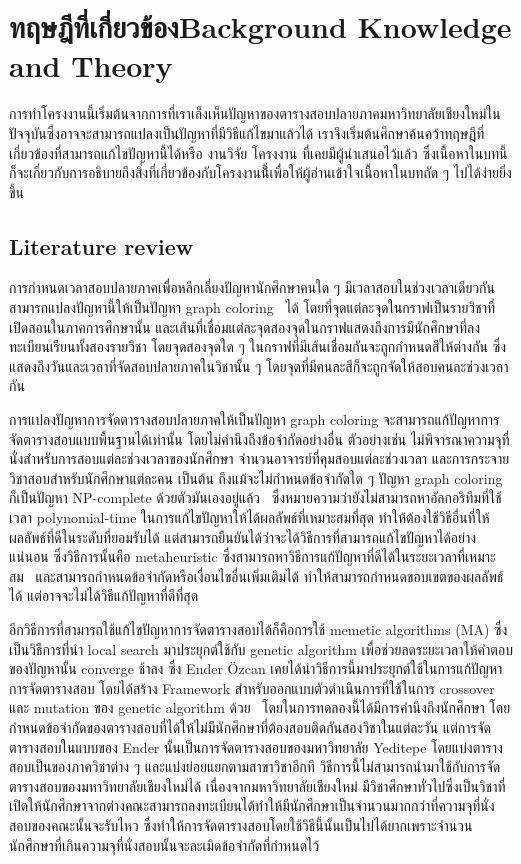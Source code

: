 \chapter{\ifcpe ทฤษฎีที่เกี่ยวข้อง\else Background Knowledge and Theory\fi}
การทำโครงงานนี้เริ่มต้นจากการที่เราเล็งเห็นปัญหาของตารางสอบปลายภาคมหาวิทยาลัยเชียงใหม่ในปัจจุบันซึ่งอาจจะสามารถแปลงเป็นปัญหาที่มีวิธีแก้ไขมาแล้วได้ เราจึงเริ่มต้นศึกษาค้นคว้าทฤษฎีที่เกี่ยวข้องที่สามารถแก้ไขปัญหานี้ได้หรือ งานวิจัย โครงงาน ที่เคยมีผู้นำเสนอไว้แล้ว
ซึ่งเนื้อหาในบทนี้ก็จะเกี่ยวกับการอธิบายถึงสิ่งที่เกี่ยวข้องกับโครงงานนี้้เพื่อให้ผู้อ่านเข้าใจเนื้อหาในบทถัด ๆ ไปได้ง่ายยิ่งขึ้น
\section{Literature review}
การกำหนดเวลาสอบปลายภาคเพื่อหลีกเลี่ยงปัญหานักศึกษาคนใด ๆ มีเวลาสอบในช่วงเวลาเดียวกันสามารถแปลงปัญหานี้ให้เป็นปัญหา graph coloring~\cite{mcs} ได้ 
โดยที่จุดแต่ละจุดในกราฟเป็นรายวิชาที่เปิดสอนในภาคการศึกษานั้น 
และเส้นที่เชื่อมแต่ละจุดสองจุดในกราฟแสดงถึงการมีนักศึกษาที่ลงทะเบียนเรียนทั้งสองรายวิชา โดยจุดสองจุดใด ๆ ในกราฟที่มีเส้นเชื่อมกันจะถูกกำหนดสีให้ต่างกัน
ซึ่งแสดงถึงวันและเวลาที่จัดสอบปลายภาคในวิชานั้น ๆ โดยจุดที่มีคนละสีก็จะถูกจัดให้สอบคนละช่วงเวลากัน

การแปลงปัญหาการจัดตารางสอบปลายภาคให้เป็นปัญหา graph coloring จะสามารถแก้ปัญหาการจัดตารางสอบแบบพื้นฐานได้เท่านั้น โดยไม่คำนึงถึงข้อจำกัดอย่างอื่น 
ตัวอย่างเช่น ไม่พิจารณาความจุที่นั่งสำหรับการสอบแต่ละช่วงเวลาของนักศึกษา จำนวนอาจารย์ที่คุมสอบแต่ละช่วงเวลา และการกระจายวิชาสอบสำหรับนักศึกษาแต่ละคน เป็นต้น
ถึงแม้จะไม่กำหนดข้อจำกัดใด ๆ ปัญหา graph coloring ก็เป็นปัญหา NP-complete ด้วยตัวมันเองอยู่แล้ว~\cite{alg-design} 
ซึ่งหมายความว่ายังไม่สามารถหาอัลกอริทึมที่ใช้เวลา polynomial-time ในการแก้ไขปัญหาให้ได้ผลลัพธ์ที่เหมาะสมที่สุด 
ทำให้ต้องใช้วิธีอื่นที่ให้ผลลัพธ์ที่ดีในระดับที่ยอมรับได้ แต่สามารถยืนยันได้ว่าจะได้วิธีการที่สามารถแก้ไขปัญหาได้อย่างแน่นอน 
ซึ่งวิธีการนั้นคือ metaheuristic ซึ่งสามารถหาวิธีการแก้ปัญหาที่ดีได้ในระยะเวลาที่เหมาะสม~\cite{meta-for-vertexcolor}
และสามารถกำหนดข้อจำกัดหรือเงื่อนไขอื่นเพิ่มเติมได้ ทำให้สามารถกำหนดขอบเขตของผลลัพธ์ได้ แต่อาจจะไม่ได้วิธีแก้ปัญหาที่ดีที่สุด

อีกวิธีการที่สามารถใช้แก้ไขปัญหาการจัดตารางสอบได้ก็คือการใช้ memetic algorithms (MA) ซึ่งเป็นวิธีการที่นำ local search มาประยุกต์ใช้กับ genetic algorithm 
เพื่อช่วยลดระยะเวลาให้คำตอบของปัญหานั้น converge ช้าลง \cite{pablo-memetic-algo} ซึ่ง Ender {\"O}zcan เคยได้นำวิธีการนี้มาประยุกต์ใช้ในการแก้ปัญหาการจัดตารางสอบ 
โดยได้สร้าง Framework สำหรับออกแบบตัวดำเนินการที่ใช้ในการ crossover และ mutation ของ genetic algorithm ด้วย~\cite{fes}
โดยในการทดลองนี้ได้มีการคำนึงถึงนักศึกษา โดยกำหนดข้อจำกัดของตารางสอบที่ได้ให้ไม่มีนักศึกษาที่ต้องสอบติดกันสองวิชาในแต่ละวัน แต่การจัดตารางสอบในแบบของ Ender 
นั้นเป็นการจัดตารางสอบของมหาวิทยาลัย Yeditepe โดยแบ่งตารางสอบเป็นของภาควิชาต่าง ๆ และแบ่งย่อยแยกตามสาขาวิชาอีกที วิธีการนี้ไม่สามารถนำมาใช้กับการจัดตารางสอบของมหาวิทยาลัยเชียงใหม่ได้
เนื่องจากมหาวิทยาลัยเชียงใหม่ มีวิชาศึกษาทั่วไปซึ่งเป็นวิชาที่เปิดให้นักศึกษาจากต่างคณะสามารถลงทะเบียนได้ทำให้มีนักศึกษาเป็นจำนวนมากกว่าที่ความจุที่นั่งสอบของคณะนั้นจะรับไหว
ซึ่งทำให้การจัดตารางสอบโดยใช้วิธีนี้นั้นเป็นไปได้ยากเพราะจำนวนนักศึกษาที่เกินความจุที่นั่งสอบนั้นจะละเมิดข้อจำกัดที่กำหนดไว้ 

